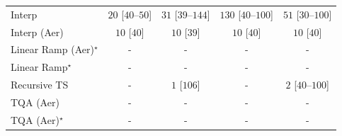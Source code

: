 \begin{tabular}{l|cccc|}
Interp & {\cellcolor[HTML]{F4FBF1}} \color[HTML]{000000} $20$ [$40$--$50$] & {\cellcolor[HTML]{F2FAEF}} \color[HTML]{000000} $31$ [$39$--$144$] & {\cellcolor[HTML]{DCF2D7}} \color[HTML]{000000} $130$ [$40$--$100$] & {\cellcolor[HTML]{EFF9EB}} \color[HTML]{000000} $51$ [$30$--$100$] \\
Interp (Aer) & {\cellcolor[HTML]{F6FCF4}} \color[HTML]{000000} $10$ [$40$] & {\cellcolor[HTML]{F6FCF4}} \color[HTML]{000000} $10$ [$39$] & {\cellcolor[HTML]{F6FCF4}} \color[HTML]{000000} $10$ [$40$] & {\cellcolor[HTML]{F6FCF4}} \color[HTML]{000000} $10$ [$40$] \\
Linear Ramp (Aer)$^\star$ & {\cellcolor[HTML]{000000}} \color[HTML]{F1F1F1} {\cellcolor{white}} \color{black} - & {\cellcolor[HTML]{000000}} \color[HTML]{F1F1F1} {\cellcolor{white}} \color{black} - & {\cellcolor[HTML]{000000}} \color[HTML]{F1F1F1} {\cellcolor{white}} \color{black} - & {\cellcolor[HTML]{000000}} \color[HTML]{F1F1F1} {\cellcolor{white}} \color{black} - \\
Linear Ramp$^\star$ & {\cellcolor[HTML]{000000}} \color[HTML]{F1F1F1} {\cellcolor{white}} \color{black} - & {\cellcolor[HTML]{000000}} \color[HTML]{F1F1F1} {\cellcolor{white}} \color{black} - & {\cellcolor[HTML]{000000}} \color[HTML]{F1F1F1} {\cellcolor{white}} \color{black} - & {\cellcolor[HTML]{000000}} \color[HTML]{F1F1F1} {\cellcolor{white}} \color{black} - \\
Recursive TS & {\cellcolor[HTML]{000000}} \color[HTML]{F1F1F1} {\cellcolor{white}} \color{black} - & {\cellcolor[HTML]{F7FCF5}} \color[HTML]{000000} $1$ [$106$] & {\cellcolor[HTML]{000000}} \color[HTML]{F1F1F1} {\cellcolor{white}} \color{black} - & {\cellcolor[HTML]{F7FCF5}} \color[HTML]{000000} $2$ [$40$--$100$] \\
TQA (Aer) & {\cellcolor[HTML]{000000}} \color[HTML]{F1F1F1} {\cellcolor{white}} \color{black} - & {\cellcolor[HTML]{000000}} \color[HTML]{F1F1F1} {\cellcolor{white}} \color{black} - & {\cellcolor[HTML]{000000}} \color[HTML]{F1F1F1} {\cellcolor{white}} \color{black} - & {\cellcolor[HTML]{000000}} \color[HTML]{F1F1F1} {\cellcolor{white}} \color{black} - \\
TQA (Aer)$^\star$ & {\cellcolor[HTML]{000000}} \color[HTML]{F1F1F1} {\cellcolor{white}} \color{black} - & {\cellcolor[HTML]{000000}} \color[HTML]{F1F1F1} {\cellcolor{white}} \color{black} - & {\cellcolor[HTML]{000000}} \color[HTML]{F1F1F1} {\cellcolor{white}} \color{black} - & {\cellcolor[HTML]{000000}} \color[HTML]{F1F1F1} {\cellcolor{white}} \color{black} - \\

\end{tabular}

